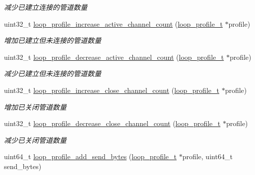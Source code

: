 \begin{DoxyCompactItemize}
\begin{DoxyCompactList}\small\item\em 减少已建立连接的管道数量 \end{DoxyCompactList}\item 
uint32\+\_\+t \hyperlink{a00078_a60b6b1d29dcb8746bc44c90b8b438544_a60b6b1d29dcb8746bc44c90b8b438544}{loop\+\_\+profile\+\_\+increase\+\_\+active\+\_\+channel\+\_\+count} (\hyperlink{a00050_ad060e1396346d2f5db1ec0597376a107_ad060e1396346d2f5db1ec0597376a107}{loop\+\_\+profile\+\_\+t} $\ast$profile)
\begin{DoxyCompactList}\small\item\em 增加已建立但未连接的管道数量 \end{DoxyCompactList}\item 
uint32\+\_\+t \hyperlink{a00078_ab1bcbe8b5c4c4618605821581cdcaacd_ab1bcbe8b5c4c4618605821581cdcaacd}{loop\+\_\+profile\+\_\+decrease\+\_\+active\+\_\+channel\+\_\+count} (\hyperlink{a00050_ad060e1396346d2f5db1ec0597376a107_ad060e1396346d2f5db1ec0597376a107}{loop\+\_\+profile\+\_\+t} $\ast$profile)
\begin{DoxyCompactList}\small\item\em 减少已建立但未连接的管道数量 \end{DoxyCompactList}\item 
uint32\+\_\+t \hyperlink{a00078_ae06a8af9d1d8e3b32a3ae6220aa904b2_ae06a8af9d1d8e3b32a3ae6220aa904b2}{loop\+\_\+profile\+\_\+increase\+\_\+close\+\_\+channel\+\_\+count} (\hyperlink{a00050_ad060e1396346d2f5db1ec0597376a107_ad060e1396346d2f5db1ec0597376a107}{loop\+\_\+profile\+\_\+t} $\ast$profile)
\begin{DoxyCompactList}\small\item\em 增加已关闭管道数量 \end{DoxyCompactList}\item 
uint32\+\_\+t \hyperlink{a00078_abae75de750f7969632e5e8087eb6c778_abae75de750f7969632e5e8087eb6c778}{loop\+\_\+profile\+\_\+decrease\+\_\+close\+\_\+channel\+\_\+count} (\hyperlink{a00050_ad060e1396346d2f5db1ec0597376a107_ad060e1396346d2f5db1ec0597376a107}{loop\+\_\+profile\+\_\+t} $\ast$profile)
\begin{DoxyCompactList}\small\item\em 减少已关闭管道数量 \end{DoxyCompactList}\item 
uint64\+\_\+t \hyperlink{a00078_a04e566a4074bb91aa86119c34157c440_a04e566a4074bb91aa86119c34157c440}{loop\+\_\+profile\+\_\+add\+\_\+send\+\_\+bytes} (\hyperlink{a00050_ad060e1396346d2f5db1ec0597376a107_ad060e1396346d2f5db1ec0597376a107}{loop\+\_\+profile\+\_\+t} $\ast$profile, uint64\+\_\+t send\+\_\+bytes)

\end{DoxyCompactItemize}
